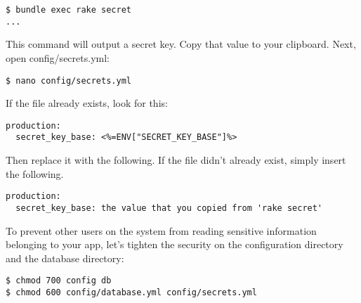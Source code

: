 \documentclass[11pt]{article}
\begin{document}
\begin{verbatim}
$ bundle exec rake secret
...
\end{verbatim}
This command will output a secret key. Copy that value to your clipboard. Next, open config/secrets.yml:

\begin{verbatim}
$ nano config/secrets.yml
\end{verbatim}

If the file already exists, look for this:

\begin{verbatim}
production:
  secret_key_base: <%=ENV["SECRET_KEY_BASE"]%>
\end{verbatim}

Then replace it with the following. If the file didn't already exist, simply insert the following.

\begin{verbatim}
production:
  secret_key_base: the value that you copied from 'rake secret'
\end{verbatim}

To prevent other users on the system from reading sensitive information belonging to your app, let's tighten the security on the configuration directory and the database directory:
\begin{verbatim}
$ chmod 700 config db
$ chmod 600 config/database.yml config/secrets.yml
\end{verbatim}
\end{document}

